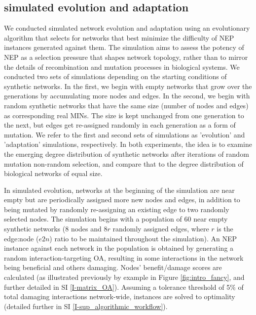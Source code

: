 \documentclass[12pt]{article}
\begin{document}
\subsection{simulated evolution and adaptation}\label{evolution_results}
We conducted simulated network evolution and adaptation using an evolutionary algorithm that selects for networks that best minimize the difficulty of NEP instances generated against them. The simulation aims to assess the potency of NEP as a selection pressure that shapes network topology, rather than to mirror the details of recombination and mutation processes in biological systems. We conducted two sets of simulations depending on the starting conditions of synthetic networks. In the first, we begin with empty networks that grow over the generations by accumulating more nodes and edges. In the second, we begin with random synthetic networks that have the same size (number of nodes and edges) as corresponding real MINs. The size is kept unchanged from one generation to the next, but edges get re-assigned randomly in each generation as a form of mutation. We refer to the first and second sets of simulations as 'evolution' and 'adaptation' simulations,  respectively. In both experiments, the idea is to examine the emerging degree distribution of synthetic networks after iterations of random mutation non-random selection, and compare that  to the degree distribution of biological networks of equal size.

In simulated evolution, networks at the beginning of the simulation are near empty but are periodically assigned more new nodes and edges, in addition to being mutated by randomly re-assigning an existing edge to two randomly selected nodes. The simulation begins with a population of 60 near empty synthetic networks (8 nodes and $8r$ randomly assigned edges, where $r$ is the edge:node ($e2n$) ratio to be maintained throughout the simulation). An NEP instance against each network in the population is obtained by generating a random interaction-targeting OA, resulting in some interactions in the network being beneficial and others damaging. Nodes' benefit/damage scores are calculated (as illustrated previously by example in Figure \ref{fig:intro_fancy}, and further detailed in SI \ref{I-matrix_OA}). Assuming a tolerance threshold of 5\% of total damaging interactions network-wide, instances are solved to optimality (detailed further in SI \ref{I-sup_algorithmic_workflow}).
\end{document}
